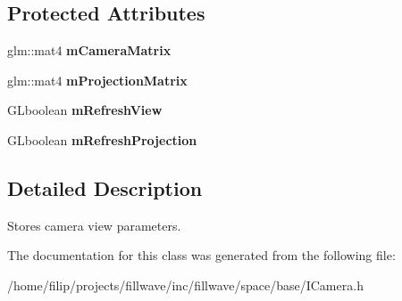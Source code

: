 \subsection*{Protected Attributes}
\begin{DoxyCompactItemize}
\item 
\mbox{\label{classflw_1_1flf_1_1ICamera_a96135bcf2aa431c21ff72586e6857cde}} 
glm\+::mat4 {\bfseries m\+Camera\+Matrix}
\item 
\mbox{\label{classflw_1_1flf_1_1ICamera_aa42f67c78d9102d1a0145c5d115e962a}} 
glm\+::mat4 {\bfseries m\+Projection\+Matrix}
\item 
\mbox{\label{classflw_1_1flf_1_1ICamera_a53df3590abc5d8e52fc7d88cf42a3c61}} 
G\+Lboolean {\bfseries m\+Refresh\+View}
\item 
\mbox{\label{classflw_1_1flf_1_1ICamera_a6553d3e78499407b28e40a149a4fc3e8}} 
G\+Lboolean {\bfseries m\+Refresh\+Projection}
\end{DoxyCompactItemize}


\subsection{Detailed Description}
Stores camera view parameters. 

The documentation for this class was generated from the following file\+:\begin{DoxyCompactItemize}
\item 
/home/filip/projects/fillwave/inc/fillwave/space/base/I\+Camera.\+h\end{DoxyCompactItemize}

